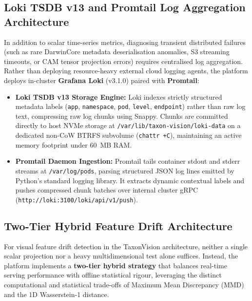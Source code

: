 \subsection{Loki TSDB v13 and Promtail Log Aggregation Architecture}
\label{sec:loki_promtail_logging}

In addition to scalar time-series metrics, diagnosing transient distributed failures (such as rare DarwinCore metadata deserialisation anomalies, S3 streaming timeouts, or CAM tensor projection errors) requires centralised log aggregation. Rather than deploying resource-heavy external cloud logging agents, the platform deploys in-cluster \textbf{Grafana Loki} (v3.1.0) paired with \textbf{Promtail}:
\begin{itemize}
    \item \textbf{Loki TSDB v13 Storage Engine:} Loki indexes strictly structured metadata labels (\texttt{app}, \texttt{namespace}, \texttt{pod}, \texttt{level}, \texttt{endpoint}) rather than raw log text, compressing raw log chunks using Snappy. Chunks are committed directly to host NVMe storage at \nolinkurl{/var/lib/taxon-vision/loki-data} on a dedicated non-CoW BTRFS subvolume (\texttt{chattr +C}), maintaining an active memory footprint under 60~MB RAM.
    \item \textbf{Promtail Daemon Ingestion:} Promtail tails container stdout and stderr streams at \nolinkurl{/var/log/pods}, parsing structured JSON log lines emitted by Python's standard logging library. It extracts dynamic contextual labels and pushes compressed chunk batches over internal cluster gRPC (\nolinkurl{http://loki:3100/loki/api/v1/push}).
\end{itemize}

\subsection{Two-Tier Hybrid Feature Drift Architecture}
For visual feature drift detection in the TaxonVision architecture, neither a single scalar projection nor a heavy multidimensional test alone suffices. Instead, the platform implements a \textbf{two-tier hybrid strategy} that balances real-time serving performance with offline statistical rigour, leveraging the distinct computational and statistical trade-offs of Maximum Mean Discrepancy (MMD) and the 1D Wasserstein-1 distance.

